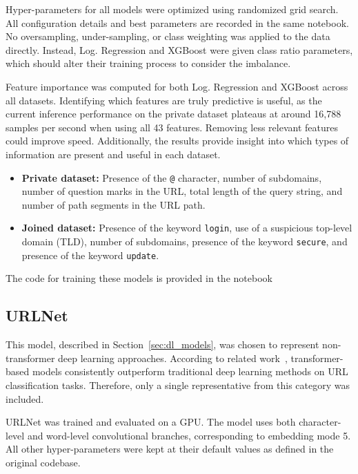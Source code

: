 Hyper-parameters for all models were optimized using randomized grid search. All configuration details and best parameters are recorded in the same notebook. No oversampling, under-sampling, or class weighting was applied to the data directly. Instead, Log. Regression and XGBoost were given class ratio parameters, which should alter their training process to consider the imbalance.

Feature importance was computed for both Log. Regression and XGBoost across all datasets. Identifying which features are truly predictive is useful, as the current inference performance on the private dataset plateaus at around 16,788 samples per second when using all 43 features. Removing less relevant features could improve speed. Additionally, the results provide insight into which types of information are present and useful in each dataset.

\begin{itemize}
    \item \textbf{Private dataset:} Presence of the \texttt{@} character, number of subdomains, number of question marks in the URL, total length of the query string, and number of path segments in the URL path.

    \item \textbf{Joined dataset:} Presence of the keyword \texttt{login}, use of a suspicious top-level domain (TLD), number of subdomains, presence of the keyword \texttt{secure}, and presence of the keyword \texttt{update}.
\end{itemize}

The code for training these models is provided in the notebook 

\subsection{URLNet}
This model, described in Section~\ref{sec:dl_models}, was chosen to represent non-transformer deep learning approaches. According to related work~\cite{TransURL}, transformer-based models consistently outperform traditional deep learning methods on URL classification tasks. Therefore, only a single representative from this category was included.

URLNet was trained and evaluated on a GPU. The model uses both character-level and word-level convolutional branches, corresponding to embedding mode 5. All other hyper-parameters were kept at their default values as defined in the original codebase.

